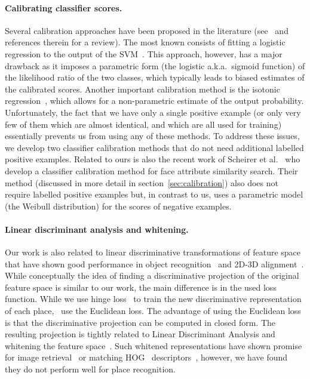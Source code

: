       
  \paragraph{Calibrating classifier scores.} 
    Several calibration approaches have been proposed in the literature (see~\cite{gebel2007calibrating} and references therein for a review). The most known consists of fitting a logistic regression to the output of the SVM~\cite{Platt99}.  This approach, however, has a major drawback as it imposes a parametric form (the logistic a.k.a.\ sigmoid function) of the likelihood ratio of the two classes, which typically leads to biased estimates of the calibrated scores. Another important calibration method is the isotonic regression~\cite{zadrozny2002transforming}, which allows for a non-parametric estimate of the output probability.
    Unfortunately, the fact that we have only a single positive example (or only very few of them which are almost identical, and which are all used for training) essentially prevents us from using any of these methods. 
    To address these issues, we develop two classifier calibration methods that do not need additional labelled positive examples. Related to ours is also the recent work of Scheirer et al.~\cite{Scheirer12} who develop a classifier calibration method for face attribute similarity search. Their method (discussed in more detail in section~\ref{sec:calibration}) also does not require labelled positive examples but, in contrast to us, uses a parametric model (the Weibull distribution) for the scores of negative examples.    
  

  \paragraph{Linear discriminant analysis and whitening.}
    {
      Our work is also related to linear discriminative transformations of feature space that have shown good performance in object recognition~\cite{Gharbi12,Hariharan12} and 2D-3D alignment~\cite{Aubry13,Aubry14}. While conceptually the idea of finding a discriminative projection of the original feature space is similar to our work, the main difference is in the used loss function. 
      While we use hinge loss~\cite{scholkopf2002learning} to train the new discriminative representation of each place,~\cite{Aubry13,Gharbi12,Hariharan12} use the Euclidean loss. The advantage of using the Euclidean loss is that the discriminative projection can be computed in closed form. The resulting projection is tightly related to Linear Discriminant Analysis and whitening the feature space~\cite{Aubry13,Gharbi12,Hariharan12}. Such whitened representations have shown promise for image retrieval~\cite{JegouChum12} or matching HOG~\cite{Dalal05} descriptors~\cite{Doersch13}, however, we have found they do not perform well for place recognition.
    }

